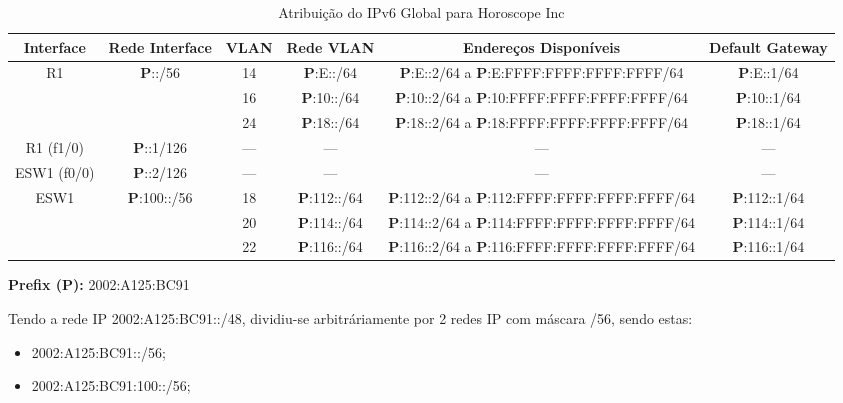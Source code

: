 \documentclass{report}
\begin{document}
\begin{table}[h!]
    \hspace*{-4.0cm}
    \centering
    \setlength{\tabcolsep}{2pt} %
    \renewcommand{\arraystretch}{1.3} %
    \begin{tabular}{|c|c|c|c|c|c|} %
        \hline
        \textbf{Interface} & \textbf{Rede Interface} & \textbf{VLAN} & \textbf{Rede VLAN} & \textbf{Endereços Disponíveis} & \textbf{Default Gateway} \\ \hline
        
        \multirow{3}{*}{R1} & \multirow{3}{*}{\textbf{P}::/56} & 14 & \textbf{P}:E::/64 & \textbf{P}:E::2/64 a \textbf{P}:E:FFFF:FFFF:FFFF:FFFF/64 & \textbf{P}:E::1/64 \\ \cline{3-6} 
         & & 16 & \textbf{P}:10::/64 & \textbf{P}:10::2/64 a \textbf{P}:10:FFFF:FFFF:FFFF:FFFF/64 & \textbf{P}:10::1/64 \\ \cline{3-6}   
         & & 24 & \textbf{P}:18::/64 & \textbf{P}:18::2/64 a \textbf{P}:18:FFFF:FFFF:FFFF:FFFF/64 & \textbf{P}:18::1/64 \\ \hline

         R1 (f1/0) & \textbf{P}::1/126 & --- & --- & --- & --- \\ \hline

         ESW1 (f0/0) & \textbf{P}::2/126 & --- & --- & --- & --- \\ \hline
         
         \multirow{3}{*}{ESW1} & \multirow{3}{*}{\textbf{P}:100::/56} & 18 & \textbf{P}:112::/64 & \textbf{P}:112::2/64 a \textbf{P}:112:FFFF:FFFF:FFFF:FFFF/64 & \textbf{P}:112::1/64 \\ \cline{3-6}   
         & & 20 & \textbf{P}:114::/64 & \textbf{P}:114::2/64 a \textbf{P}:114:FFFF:FFFF:FFFF:FFFF/64 & \textbf{P}:114::1/64 \\ \cline{3-6}   
         & & 22 & \textbf{P}:116::/64 & \textbf{P}:116::2/64 a \textbf{P}:116:FFFF:FFFF:FFFF:FFFF/64 & \textbf{P}:116::1/64 \\ \hline

    \end{tabular}
    \textbf{Prefix (P):} 2002:A125:BC91
    \caption{Atribuição do IPv6 Global para Horoscope Inc}
\end{table}

Tendo a rede IP 2002:A125:BC91::/48, dividiu-se arbitráriamente por 2 redes IP com máscara /56, sendo estas: 
\begin{itemize}
    \item 2002:A125:BC91::/56;
    \item 2002:A125:BC91:100::/56; 
\end{itemize}
\end{document}

